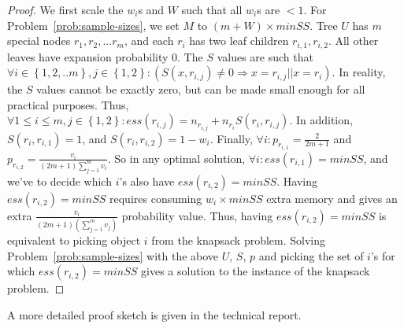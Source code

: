 {\begin{proof}
We first scale the $w_i$s and $W$ such that all $w_i$s are $< 1$. For Problem~\ref{prob:sample-sizes}, we set $M$ to $(m + W) \times minSS$. Tree $U$ has $m$ special nodes $r_1, r_2, ... r_m$, and each $r_i$ has two leaf children $r_{i,1}, r_{i,2}$. All other leaves have expansion probability $0$. 
The $S$ values are such that $\forall i \in \left\lbrace 1, 2, ..m\right\rbrace, j \in \left\lbrace 1, 2 \right\rbrace : (S(x, r_{i,j}) \neq 0 \Rightarrow x = r_{i,j} || x = r_i)$. In reality, the $S$ values cannot be exactly zero, but can be made small enough for all practical purposes. Thus, $\forall 1 \leq i \leq m, j \in \left\lbrace 1,2 \right\rbrace : ess(r_{i,j}) = n_{r_{i,j}} + n_{r_i}S(r_i, r_{i,j})$. In addition, $S(r_i, r_{i,1}) = 1$, and $S(r_i, r_{i,2}) = 1 - w_i$. Finally, $\forall i : p_{r_{i,1}} = \frac{2}{2m+1}$ and $p_{r_{i,2}} = \frac{v_i}{(2m+1)\sum_{j=1}^{m}v_i}$. So in any optimal solution, $\forall i : ess(r_{i,1}) = minSS$, and we've to decide which $i$'s also have $ess(r_{i,2}) = minSS$. Having $ess(r_{i,2}) = minSS$ requires consuming $w_i \times minSS$ extra memory and gives an extra $\frac{v_i}{(2m+1)(\sum_{j=1}^{m}v_j)}$ probability value. Thus, having $ess(r_{i,2}) = minSS$ is equivalent to picking object $i$ from the knapsack problem. Solving Problem~\ref{prob:sample-sizes} with the above $U$, $S$, $p$ and picking the set of $i$'s for which $ess(r_{i,2}) = minSS$ gives a solution to the instance of the knapsack problem. 
\end{proof}
A more detailed proof sketch is given in the technical report.
}

